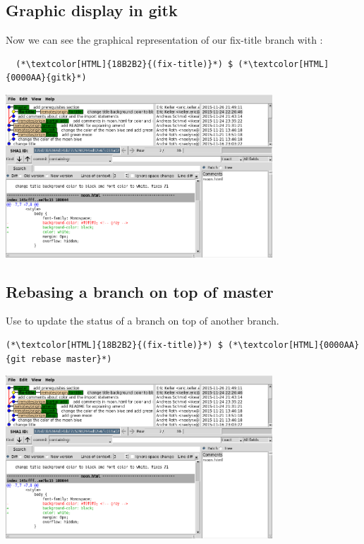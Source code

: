 \subsection{Graphic display in gitk}
\begin{frame}[fragile]
  \subslidetitle

  Now we can see the graphical representation of our fix-title branch with :
  \begin{lstlisting}
  (*\textcolor[HTML]{18B2B2}{(fix-title)}*) $ (*\textcolor[HTML]{0000AA}{gitk}*)
\end{lstlisting}

  \vspace{1em}

  \centerline{\includegraphics[width=10cm]{../screen/gitk-fix-title.png}}

\end{frame}

\subsection{Rebasing a branch on top of master}
\begin{frame}[fragile]
  \subslidetitle

  Use  to update the status of a branch on top of another branch.

  \begin{lstlisting}
(*\textcolor[HTML]{18B2B2}{(fix-title)}*) $ (*\textcolor[HTML]{0000AA}{git rebase master}*)
\end{lstlisting}

  \vspace{1em}

  \centerline{\includegraphics[width=10cm]{../screen/gitk-fix-title.png}}

\end{frame}


